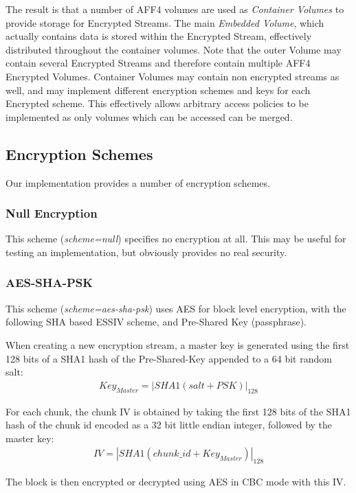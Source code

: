 \documentclass[10pt, conference]{IEEEtran}
\begin{document}
The result is that a number of AFF4 volumes are used as {\em Container
Volumes} to provide storage for Encrypted Streams. The main {\em
Embedded Volume}, which actually contains data is stored within the
Encrypted Stream, effectively distributed throughout the container
volumes. Note that the outer Volume may contain several Encrypted
Streams and therefore contain multiple AFF4 Encrypted 
Volumes. Container Volumes may contain non encrypted streams as well,
and may implement different encryption schemes and keys for each
Encrypted scheme. This effectively allows arbitrary access policies to
be implemented as only volumes which can be accessed can be merged.

\subsection{Encryption Schemes}
Our implementation provides a number of encryption schemes.

\subsubsection{Null Encryption}
This scheme ({\em scheme=null}) specifies no encryption at all. This
may be useful for testing an implementation, but obviously provides
no real security.

\subsubsection{AES-SHA-PSK}
This scheme ({\em scheme=aes-sha-psk}) uses AES for block level
encryption, with the following SHA based ESSIV scheme, and Pre-Shared
Key (passphrase).

When creating a new encryption stream, a master key is generated using
the first 128 bits of a SHA1 hash of the Pre-Shared-Key appended to a
64 bit random salt:
\begin{eqnarray}
Key_{Master} = \left | SHA1(salt + PSK) \right | _{128}
\end{eqnarray}

For each chunk, the chunk IV is obtained by taking the first 128 bits
of the SHA1 hash of the chunk id encoded as a 32 bit little endian
integer, followed by the master key:
\begin{eqnarray}
IV = \left | SHA1(chunk\_id + Key_{Master}) \right | _{128}
\end{eqnarray}

The block is then encrypted or decrypted using AES in CBC mode with
this IV.
\end{document}
